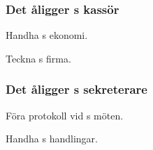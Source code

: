 \subsubsection{Det åligger \ARMIT{}s kassör}
\begin{att}
	\item Handha \ARMIT{}s ekonomi.
	\item Teckna \ARMIT{}s firma.
\end{att}

\subsubsection{Det åligger \ARMIT{}s sekreterare}
\begin{att}
	\item Föra protokoll vid \ARMIT{}s möten.
	\item Handha \ARMIT{}s handlingar.
\end{att}